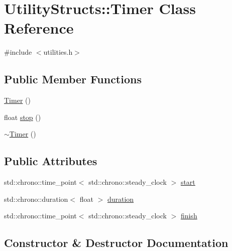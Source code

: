 \hypertarget{class_utility_structs_1_1_timer}{}\section{Utility\+Structs\+:\+:Timer Class Reference}
\label{class_utility_structs_1_1_timer}


{\ttfamily \#include $<$utilities.\+h$>$}

\subsection*{Public Member Functions}
\begin{DoxyCompactItemize}
\item 
\hyperlink{class_utility_structs_1_1_timer_a8513b72cae3808920cc5f76c28b34d63_a8513b72cae3808920cc5f76c28b34d63}{Timer} ()
\item 
float \hyperlink{class_utility_structs_1_1_timer_a12f62b57c263d563efd6089cff52355f_a12f62b57c263d563efd6089cff52355f}{stop} ()
\item 
\hyperlink{class_utility_structs_1_1_timer_a377c1febadb76e78d9a36bd81b3ab676_a377c1febadb76e78d9a36bd81b3ab676}{$\sim$\+Timer} ()
\end{DoxyCompactItemize}
\subsection*{Public Attributes}
\begin{DoxyCompactItemize}
\item 
std\+::chrono\+::time\+\_\+point$<$ std\+::chrono\+::steady\+\_\+clock $>$ \hyperlink{class_utility_structs_1_1_timer_a60bc754cb86990dad0003e8d49048c07_a60bc754cb86990dad0003e8d49048c07}{start}
\item 
std\+::chrono\+::duration$<$ float $>$ \hyperlink{class_utility_structs_1_1_timer_aa78ff6477de7008371025bd459a262e4_aa78ff6477de7008371025bd459a262e4}{duration}
\item 
std\+::chrono\+::time\+\_\+point$<$ std\+::chrono\+::steady\+\_\+clock $>$ \hyperlink{class_utility_structs_1_1_timer_a9b87226726489b3885d6faf4373c34b5_a9b87226726489b3885d6faf4373c34b5}{finish}
\end{DoxyCompactItemize}


\subsection{Constructor \& Destructor Documentation}
\mbox{\label{class_utility_structs_1_1_timer_a8513b72cae3808920cc5f76c28b34d63_a8513b72cae3808920cc5f76c28b34d63}} 
